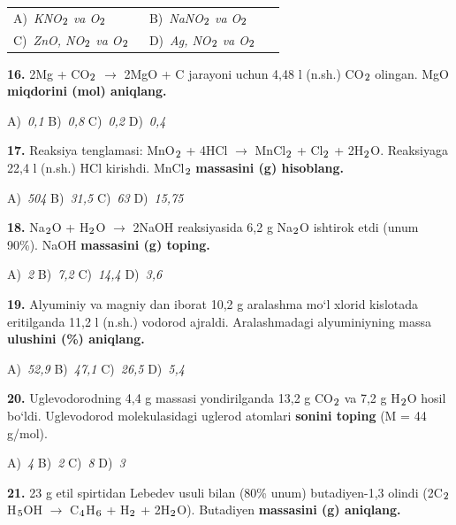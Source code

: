 \documentclass[11pt,a4paper]{article}
\renewcommand{\textsubscript}[1]{\ensuremath{_{\text{\fontsize{8}{8}\selectfont #1}}}}
\begin{document}
\begin{multicols}{2}
\noindent\begin{tabular}{@{}p{0.47\linewidth}@{}p{0.47\linewidth}@{}}
A)~\textsl{KNO\textsubscript{2} va O\textsubscript{2}} & B)~\textsl{NaNO\textsubscript{2} va O\textsubscript{2}} \\
C)~\textsl{ZnO, NO\textsubscript{2} va O\textsubscript{2}} & D)~\textsl{Ag, NO\textsubscript{2} va O\textsubscript{2}} \\
\end{tabular}\par
\vspace{4pt}
\noindent\textbf{16.} 2Mg + CO\textsubscript{2} $\to$ 2MgO + C jarayoni uchun 4,48 l (n.sh.) CO\textsubscript{2} olingan. MgO \textbf{miqdorini (mol) aniqlang.}

\noindent A)~\textsl{0,1} \hfill B)~\textsl{0,8} \hfill C)~\textsl{0,2} \hfill D)~\textsl{0,4}\par
\vspace{4pt}
\noindent\textbf{17.} Reaksiya tenglamasi: MnO\textsubscript{2} + 4HCl $\to$ MnCl\textsubscript{2} + Cl\textsubscript{2} + 2H\textsubscript{2}O. Reaksiyaga 22,4 l (n.sh.) HCl kirishdi. MnCl\textsubscript{2} \textbf{massasini (g) hisoblang.}

\noindent A)~\textsl{504} \hfill B)~\textsl{31,5} \hfill C)~\textsl{63} \hfill D)~\textsl{15,75}\par
\vspace{4pt}
\noindent\textbf{18.} Na\textsubscript{2}O + H\textsubscript{2}O $\to$ 2NaOH reaksiyasida 6,2 g Na\textsubscript{2}O ishtirok etdi (unum 90\%). NaOH \textbf{massasini (g) toping.}

\noindent A)~\textsl{2} \hfill B)~\textsl{7,2} \hfill C)~\textsl{14,4} \hfill D)~\textsl{3,6}\par
\vspace{4pt}
\noindent\textbf{19.} Alyuminiy va magniy dan iborat 10,2 g aralashma mo`l xlorid kislotada eritilganda 11,2 l (n.sh.) vodorod ajraldi. Aralashmadagi alyuminiyning massa \textbf{ulushini (\%) aniqlang.}

\noindent A)~\textsl{52,9} \hfill B)~\textsl{47,1} \hfill C)~\textsl{26,5} \hfill D)~\textsl{5,4}\par
\vspace{4pt}
\noindent\textbf{20.} Uglevodorodning 4,4 g massasi yondirilganda 13,2 g CO\textsubscript{2} va 7,2 g H\textsubscript{2}O hosil bo`ldi. Uglevodorod molekulasidagi uglerod atomlari \textbf{sonini toping} (M = 44 g/mol).

\noindent A)~\textsl{4} \hfill B)~\textsl{2} \hfill C)~\textsl{8} \hfill D)~\textsl{3}\par
\vspace{4pt}
\noindent\textbf{21.} 23 g etil spirtidan Lebedev usuli bilan (80\% unum) butadiyen-1,3 olindi (2C\textsubscript{2}H\textsubscript{5}OH $\to$ C\textsubscript{4}H\textsubscript{6} + H\textsubscript{2} + 2H\textsubscript{2}O). Butadiyen \textbf{massasini (g) aniqlang.}


\end{multicols}
\end{document}
